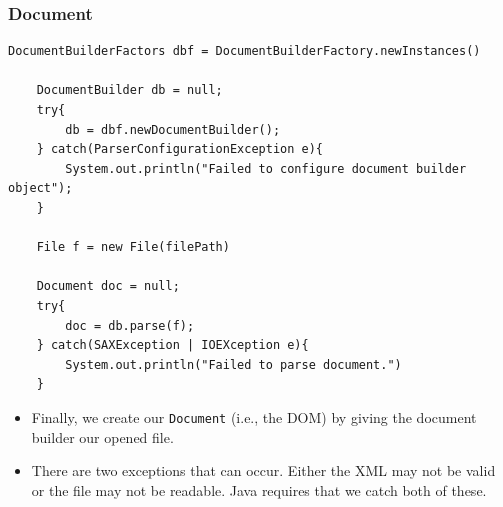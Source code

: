 \documentclass{beamer}
\begin{document}
\begin{frame}[fragile]
    \frametitle{Document}
    \begin{lstlisting}[basicstyle=\tiny]
    DocumentBuilderFactors dbf = DocumentBuilderFactory.newInstances()

    DocumentBuilder db = null;
    try{
        db = dbf.newDocumentBuilder();
    } catch(ParserConfigurationException e){
        System.out.println("Failed to configure document builder object");
    }

    File f = new File(filePath)

    Document doc = null;
    try{
        doc = db.parse(f);
    } catch(SAXException | IOEXception e){
        System.out.println("Failed to parse document.")
    }
    \end{lstlisting}
    \begin{itemize}
        \item Finally, we create our \lstinline|Document| (i.e., the DOM) by giving the document builder our opened file.
        \item There are two exceptions that can occur. Either the XML may not be valid or the file may not be readable. Java requires that we catch both of these.
    \end{itemize}
\end{frame}
\end{document}

